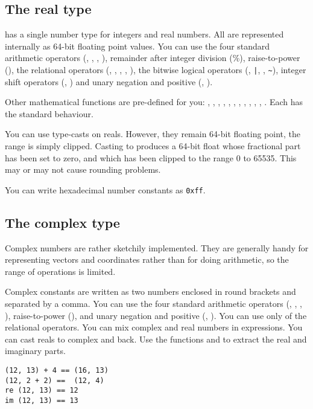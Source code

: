\subsection{The real type}

\nip{} has a single number type for integers and real numbers. All are
represented internally as 64-bit floating point values. You can use the four
standard arithmetic operators (\ct{+}, \ct{-}, \ct{*}, \ct{/}), remainder
after integer division (\%), raise-to-power (\ct{**}), the relational
operators (\ct{<}, \ct{<=}, \ct{>}, \ct{>=}, \ct{==}), the bitwise logical
operators (\ct{\&}, \verb+|+, \rtp{}, \verb+~+), integer shift operators
(\ct{<<}, \ct{>>}) and unary negation and positive (\ct{-}, \ct{+}).

Other mathematical functions are pre-defined for you:  , ,
, , , , , , ,
, , . Each has the standard behaviour.

You can use type-casts on reals. However, they remain 64-bit floating point,
the range is simply clipped. Casting to  produces a 64-bit
float whose fractional part has been set to zero, and which has been
clipped to the range 0 to 65535. This may or may not cause rounding problems.

You can write hexadecimal number constants as \verb"0xff".

\subsection{The complex type}

Complex numbers are rather sketchily implemented. They are generally handy for
representing vectors and coordinates rather than for doing arithmetic, so the
range of operations is limited.

Complex constants are written as two numbers enclosed in round brackets and
separated by a comma. You can use the four standard arithmetic operators
(\ct{+}, \ct{-}, \ct{*}, \ct{/}), raise-to-power (\ct{**}), and unary negation
and positive (\ct{-}, \ct{+}). You can use \ct{==} only of the relational
operators. You can mix complex and real numbers in expressions. You can cast
reals to complex and back.  Use the functions  and 
to extract the real and imaginary parts.

\begin{verbatim}
(12, 13) + 4 == (16, 13)
(12, 2 + 2) ==  (12, 4)
re (12, 13) == 12
im (12, 13) == 13
\end{verbatim}


